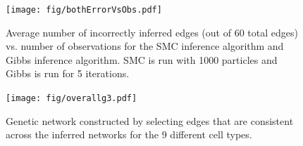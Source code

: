 \documentclass{article}
\begin{document}
\begin{figure}[tbp]
  \centering               
  \texttt{[image: fig/bothErrorVsObs.pdf]}
  \caption{Average number of incorrectly inferred edges (out of 60 total edges) vs. number of observations for the SMC inference algorithm and Gibbs inference algorithm. SMC is run with 1000 particles and Gibbs is run for 5 iterations.}
  \label{fig:errorVsObs}
\end{figure}



\begin{figure}[b]
  \centering               
  \texttt{[image: fig/overallg3.pdf]}
  \caption{Genetic network constructed by selecting edges that are consistent across the inferred networks for the 9 different cell types.}
  \label{fig:geneResults}
\end{figure}
\end{document}
